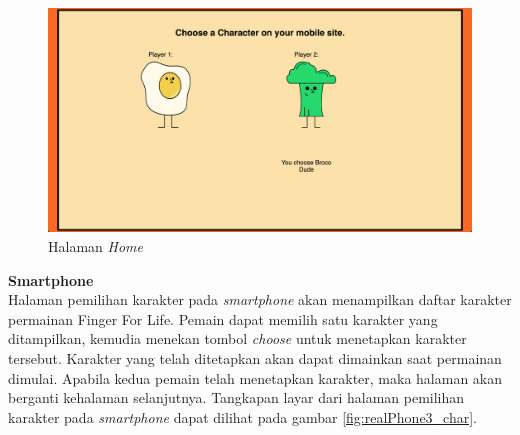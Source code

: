 \begin{enumerate}
	\begin{figure}[H]
		\centering
		\includegraphics[scale=0.25]{Gambar/realWeb3_char}
		\caption{Halaman \textit{Home}}
		\label{fig:realWeb3_char}
	\end{figure}
	
	\textbf{Smartphone} \\
	Halaman pemilihan karakter pada \textit{smartphone} akan menampilkan daftar karakter permainan Finger For Life. Pemain dapat memilih satu karakter yang ditampilkan, kemudia menekan tombol \textit{choose} untuk menetapkan karakter tersebut. Karakter yang telah ditetapkan akan dapat dimainkan saat permainan dimulai. Apabila kedua pemain telah menetapkan karakter, maka halaman akan berganti kehalaman selanjutnya. Tangkapan layar dari halaman pemilihan karakter pada \textit{smartphone} dapat dilihat pada gambar \ref{fig:realPhone3_char}.
	

\end{enumerate}
